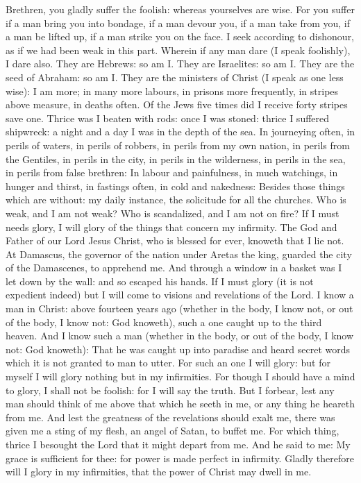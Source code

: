 \begin{multicols}{2}
Brethren, you gladly suffer the foolish: whereas yourselves are wise.  For you suffer
if a man bring you into bondage, if a man devour you, if a man take from you,
if a man be lifted up, if a man strike you on the face.  I seek according to
dishonour, as if we had been weak in this part. Wherein if any man dare (I
speak foolishly), I dare also.  They are Hebrews: so am I. They are Israelites:
so am I.  They are the seed of Abraham: so am I.  They are the ministers of
Christ (I speak as one less wise): I am more; in many more labours, in prisons
more frequently, in stripes above measure, in deaths often.  Of the Jews five
times did I receive forty stripes save one.  Thrice was I beaten with rods:
once I was stoned: thrice I suffered shipwreck: a night and a day I was in the
depth of the sea.  In journeying often, in perils of waters, in perils of
robbers, in perils from my own nation, in perils from the Gentiles, in perils
in the city, in perils in the wilderness, in perils in the sea, in perils from
false brethren: In labour and painfulness, in much watchings, in hunger and
thirst, in fastings often, in cold and nakedness: Besides those things which
are without: my daily instance, the solicitude for all the churches.
 Who is weak, and I am not weak? Who is scandalized, and I am not on
fire?  If I must needs glory, I will glory of the things that concern my
infirmity.  The God and Father of our Lord Jesus Christ, who is blessed for
ever, knoweth that I lie not.  At Damascus, the governor of the nation under
Aretas the king, guarded the city of the Damascenes, to apprehend me.  And
through a window in a basket was I let down by the wall: and so escaped his
hands.  If I must glory (it is not expedient indeed) but I will come to visions
and revelations of the Lord.  I know a man in Christ: above fourteen years ago
(whether in the body, I know not, or out of the body, I know not: God knoweth),
such a one caught up to the third heaven.  And I know such a man (whether in
the body, or out of the body, I know not: God knoweth): That he was caught up
into paradise and heard secret words which it is not granted to man to utter.
For such an one I will glory: but for myself I will glory nothing but in my
infirmities.  For though I should have a mind to glory, I shall not be foolish:
for I will say the truth. But I forbear, lest any man should think of me above
that which he seeth in me, or any thing he heareth from me.  And lest the
greatness of the revelations should exalt me, there was given me a sting of my
flesh, an angel of Satan, to buffet me.  For which thing, thrice I besought the
Lord that it might depart from me.  And he said to me: My grace is sufficient
for thee: for power is made perfect in infirmity. Gladly therefore will I glory
in my infirmities, that the power of Christ may dwell in me.  



\end{multicols}
